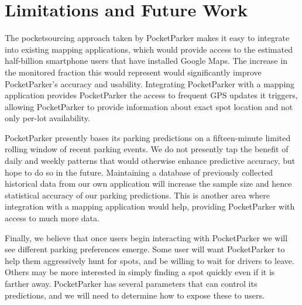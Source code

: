 \section{Limitations and Future Work}

The pocketsourcing approach taken by PocketParker makes it easy to integrate
into existing mapping applications, which would provide access to the
estimated half-billion smartphone users that have installed Google Maps. The
increase in the monitored fraction this would represent would significantly
improve PocketParker's accuracy and usability. Integrating PocketParker with a
mapping application provides PocketParker the access to frequent GPS updates
it triggers, allowing PocketParker to provide information about exact spot
location and not only per-lot availability.

PocketParker presently bases its parking predictions on a fifteen-minute
limited rolling window of recent parking events. We do not presently tap the
benefit of daily and weekly patterns that would otherwise enhance predictive
accuracy, but hope to do so in the future. Maintaining a database of
previously collected historical data from our own application will increase
the sample size and hence statistical accuracy of our parking predictions.
This is another area where integration with a mapping application would help,
providing PocketParker with access to much more data.

Finally, we believe that once users begin interacting with PocketParker we
will see different parking preferences emerge. Some user will want
PocketParker to help them aggressively hunt for spots, and be willing to wait
for drivers to leave. Others may be more interested in simply finding a spot
quickly even if it is farther away. PocketParker has several parameters that
can control its predictions, and we will need to determine how to expose
these to users.

%
%
%
%
%
%
%
